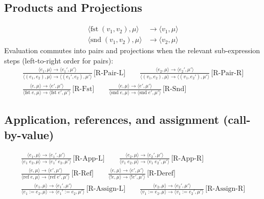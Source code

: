 \documentclass[11pt,a4paper]{article}
\begin{document}
\subsection{Products and Projections}
\[
\begin{aligned}
  \langle \text{fst}\; (v_1, v_2), \mu \rangle &\to \langle v_1, \mu \rangle \\
  \langle \text{snd}\; (v_1, v_2), \mu \rangle &\to \langle v_2, \mu \rangle
\end{aligned}
\]
Evaluation commutes into pairs and projections when the relevant sub-expression steps (left-to-right order for pairs):
\begin{gather*}
  \frac{\langle e_1, \mu \rangle \to \langle e_1', \mu' \rangle}{\langle (e_1, e_2), \mu \rangle \to \langle (e_1', e_2), \mu' \rangle}\,\text{[R-Pair-L]}
  \qquad
  \frac{\langle e_2, \mu \rangle \to \langle e_2', \mu' \rangle}{\langle (v_1, e_2), \mu \rangle \to \langle (v_1, e_2'), \mu' \rangle}\,\text{[R-Pair-R]}
  \\[0.75em]
  \frac{\langle e, \mu \rangle \to \langle e', \mu' \rangle}{\langle \text{fst}\; e, \mu \rangle \to \langle \text{fst}\; e', \mu' \rangle}\,\text{[R-Fst]}
  \qquad
  \frac{\langle e, \mu \rangle \to \langle e', \mu' \rangle}{\langle \text{snd}\; e, \mu \rangle \to \langle \text{snd}\; e', \mu' \rangle}\,\text{[R-Snd]}
\end{gather*}

\subsection{Application, references, and assignment (call-by-value)}
\begin{gather*}
  \frac{\langle e_1, \mu \rangle \to \langle e_1', \mu' \rangle}{\langle e_1\; e_2, \mu \rangle \to \langle e_1'\; e_2, \mu' \rangle}\,\text{[R-App-L]}
  \qquad
  \frac{\langle e_2, \mu \rangle \to \langle e_2', \mu' \rangle}{\langle v_1\; e_2, \mu \rangle \to \langle v_1\; e_2', \mu' \rangle}\,\text{[R-App-R]}
  \\[0.75em]
  \frac{\langle e, \mu \rangle \to \langle e', \mu' \rangle}{\langle \text{ref}\; e, \mu \rangle \to \langle \text{ref}\; e', \mu' \rangle}\,\text{[R-Ref]}
  \qquad
  \frac{\langle e, \mu \rangle \to \langle e', \mu' \rangle}{\langle {!}e, \mu \rangle \to \langle {!}e', \mu' \rangle}\,\text{[R-Deref]}
  \\[0.75em]
  \frac{\langle e_1, \mu \rangle \to \langle e_1', \mu' \rangle}{\langle e_1 \mathrel{:=} e_2, \mu \rangle \to \langle e_1' \mathrel{:=} e_2, \mu' \rangle}\,\text{[R-Assign-L]}
  \qquad
  \frac{\langle e_2, \mu \rangle \to \langle e_2', \mu' \rangle}{\langle v_1 \mathrel{:=} e_2, \mu \rangle \to \langle v_1 \mathrel{:=} e_2', \mu' \rangle}\,\text{[R-Assign-R]}
\end{gather*}
\end{document}
